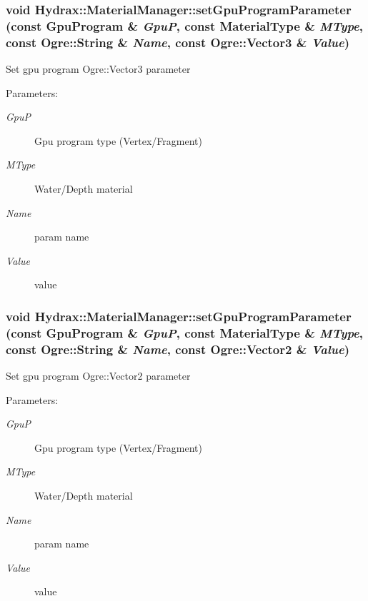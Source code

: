 \begin{CompactItemize}
{\subsubsection[{setGpuProgramParameter}]{\setlength{\rightskip}{0pt plus 5cm}void Hydrax::MaterialManager::setGpuProgramParameter (const {\bf GpuProgram} \& {\em GpuP}, \/  const {\bf MaterialType} \& {\em MType}, \/  const Ogre::String \& {\em Name}, \/  const Ogre::Vector3 \& {\em Value})}}
\label{class_hydrax_1_1_material_manager_8f696ec503c68b349a417b4c82cf9dfc}


Set gpu program Ogre::Vector3 parameter \begin{Desc}
\item[Parameters:]
\begin{description}
\item[{\em GpuP}]Gpu program type (Vertex/Fragment) \item[{\em MType}]Water/Depth material \item[{\em Name}]param name \item[{\em Value}]value \end{description}
\end{Desc}
\hypertarget{class_hydrax_1_1_material_manager_fca345e734a82f62917358eef8c8ea34}{
\subsubsection[{setGpuProgramParameter}]{\setlength{\rightskip}{0pt plus 5cm}void Hydrax::MaterialManager::setGpuProgramParameter (const {\bf GpuProgram} \& {\em GpuP}, \/  const {\bf MaterialType} \& {\em MType}, \/  const Ogre::String \& {\em Name}, \/  const Ogre::Vector2 \& {\em Value})}}
\label{class_hydrax_1_1_material_manager_fca345e734a82f62917358eef8c8ea34}


Set gpu program Ogre::Vector2 parameter \begin{Desc}
\item[Parameters:]
\begin{description}
\item[{\em GpuP}]Gpu program type (Vertex/Fragment) \item[{\em MType}]Water/Depth material \item[{\em Name}]param name \item[{\em Value}]value \end{description}
\end{Desc}
\hypertarget{class_hydrax_1_1_material_manager_f5f8e190d3e26cca04d8503e947ffba5}{
}
\end{CompactItemize}

